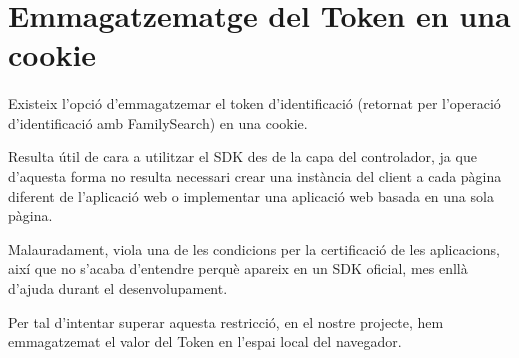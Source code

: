 \section{Emmagatzematge del Token en una cookie}

    \paragraph{}
    Existeix l'opció d'emmagatzemar el token d'identificació (retornat per l’operació d'identificació amb FamilySearch) en una cookie.

    Resulta útil de cara a utilitzar el SDK des de la capa del controlador, ja que d’aquesta forma no resulta necessari crear una instància del client a cada pàgina diferent de l’aplicació web o implementar una aplicació web basada en una sola pàgina.

    Malauradament, viola una de les condicions per la certificació de les aplicacions, així que no s'acaba d'entendre perquè apareix en un SDK oficial, mes enllà d'ajuda durant el desenvolupament.

    Per tal d'intentar superar aquesta restricció, en el nostre projecte, hem emmagatzemat el valor del Token en l’espai local del navegador.
